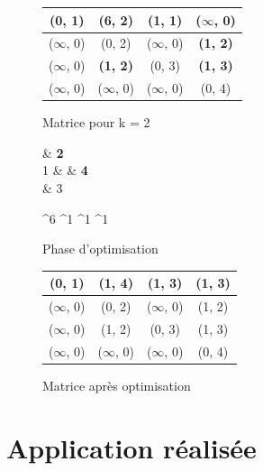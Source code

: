 \documentclass[a4paper,12pt,final] {article}
\begin{document}
\begin{figure}[htpd]
\begin{center}
\begin{tabular}{|c|c|c|c|}
\hline
(0, 1) & (6, 2) & (1, 1) & ($\infty$, 0) \\
\hline
($\infty$, 0) & (0, 2) & ($\infty$, 0) & {\color{red} \bf (1, 2)} \\
\hline
($\infty$, 0) & {\color{red} \bf (1, 2)} & (0, 3) & {\color{red} \bf (1, 3)}\\
\hline
($\infty$, 0) & ($\infty$, 0) & ($\infty$, 0) & (0, 4) \\
\hline
\end{tabular}
\end{center}
\caption{Matrice pour k = 2}
\end{figure}

\begin{figure}[htpd]
 \centering
 \begin{psmatrix}[mnode=circle]
	    & {\color{red} \bf 2}\\
	 1 &    & {\color{red} \bf 4}\\
	    & 3\\
\end{psmatrix}
	
	^{6}
	^{1}
	^{1}
	^{1}

  \caption{Phase d'optimisation}
\end{figure}

\begin{figure}[htpd]
\begin{center}
\begin{tabular}{|c|c|c|c|}
\hline
(0, 1) & {\color{red} \bf (1, 4)} & (1, 3) & {\color{red} \bf (1, 3)} \\
\hline
($\infty$, 0) & (0, 2) & ($\infty$, 0) & (1, 2) \\
\hline
($\infty$, 0) & (1, 2) & (0, 3) & (1, 3)\\
\hline
($\infty$, 0) & ($\infty$, 0) & ($\infty$, 0) & (0, 4) \\
\hline
\end{tabular}
\end{center}
\caption{Matrice après optimisation}
\end{figure}

\newpage
\section{Application réalisée}
\end{document}

